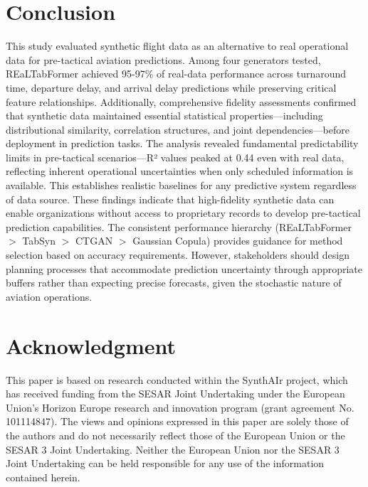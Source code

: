 \documentclass[conference]{IEEEtran}
\begin{document}
\section{Conclusion}

This study evaluated synthetic flight data as an alternative to real operational data for pre-tactical aviation predictions. Among four generators tested, REaLTabFormer achieved 95-97\% of real-data performance across turnaround time, departure delay, and arrival delay predictions while preserving critical feature relationships. Additionally, comprehensive fidelity assessments confirmed that synthetic data maintained essential statistical properties—including distributional similarity, correlation structures, and joint dependencies—before deployment in prediction tasks.
The analysis revealed fundamental predictability limits in pre-tactical scenarios—R² values peaked at 0.44 even with real data, reflecting inherent operational uncertainties when only scheduled information is available. This establishes realistic baselines for any predictive system regardless of data source.
These findings indicate that high-fidelity synthetic data can enable organizations without access to proprietary records to develop pre-tactical prediction capabilities. The consistent performance hierarchy (REaLTabFormer $>$ TabSyn $>$ CTGAN $>$ Gaussian Copula) provides guidance for method selection based on accuracy requirements. However, stakeholders should design planning processes that accommodate prediction uncertainty through appropriate buffers rather than expecting precise forecasts, given the stochastic nature of aviation operations.


\section*{Acknowledgment}

This paper is based on research conducted within the SynthAIr project, which has received funding from the SESAR Joint Undertaking under the European Union’s Horizon Europe research and innovation program (grant agreement No. 101114847). The views and opinions expressed in this paper are solely those of the authors and do not necessarily reflect those of the European Union or the SESAR 3 Joint Undertaking. Neither the European Union nor the SESAR 3 Joint Undertaking can be held responsible for any use of the information contained herein.


\balance



\end{document}
